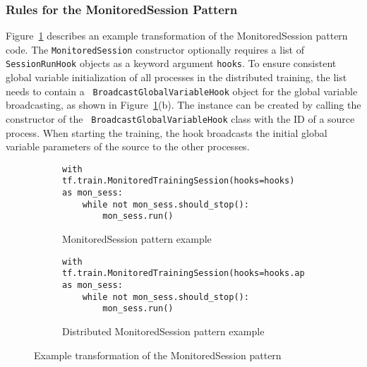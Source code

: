 \subsubsection{Rules for the MonitoredSession Pattern}
Figure~\ref{fig:trans:monsesstrans} describes an example transformation of the
MonitoredSession pattern code.
The {\tt MonitoredSession} constructor optionally requires a list of {\tt
SessionRunHook} objects as a keyword argument {\tt hooks}.
To ensure consistent global variable initialization of all processes in the
distributed training, the list needs to contain a {\tt
BroadcastGlobalVariableHook} object for the global variable broadcasting, as
shown in Figure~\ref{fig:trans:monsesstrans}(b).
The instance can be created by calling the constructor of the {\tt
BroadcastGlobalVariableHook} class with the ID of a source process.  
When starting the training, the hook broadcasts the initial global variable
parameters of the source to the other processes.\\

\begin{figure}
  \centering
  \begin{subfigure}[t]{0.8\textwidth}
    \begin{lstlisting}[style=mpython]
with tf.train.MonitoredTrainingSession(hooks=hooks) as mon_sess:
    while not mon_sess.should_stop():
        mon_sess.run()\end{lstlisting}
    \caption{MonitoredSession pattern example}
  \end{subfigure}
  \hspace{5mm}
  \begin{subfigure}[t]{0.8\textwidth}
    \begin{lstlisting}[style=mpython]
with tf.train.MonitoredTrainingSession(hooks=hooks.append(hvd.BroadcastGlobalVariablesHook(0)) as mon_sess:
    while not mon_sess.should_stop():
        mon_sess.run()\end{lstlisting}
    \caption{Distributed MonitoredSession pattern example}
  \end{subfigure}
  \caption{Example transformation of the MonitoredSession pattern}
  \label{fig:trans:monsesstrans}
\end{figure}


\vspace{-1em}

